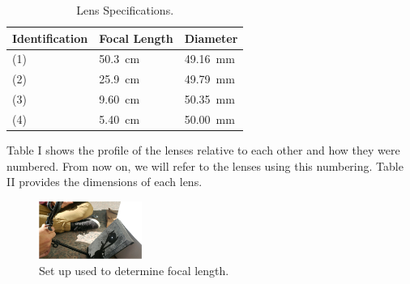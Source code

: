 \vspace*{-\baselineskip} %
\vspace*{-\baselineskip} %

\begin{table}[!h]
  \begin{center}
    \caption{Lens Specifications.} \label{lens_specs}
    \begin{tabular}{l | l | l}
      \hline \hline
      \multicolumn{1}{l}{\bf Identification} &
      \multicolumn{1}{l}{\bf Focal Length} &
      \multicolumn{1}{l}{\bf Diameter} \\
      \hline
      (1) & \SI{50.3}{\centi\meter} & \SI{49.16}{\milli\meter} \\
      (2) & \SI{25.9}{\centi\meter} & \SI{49.79}{\milli\meter} \\
      (3) & \SI{9.60}{\centi\meter} & \SI{50.35}{\milli\meter} \\
      (4) & \SI{5.40}{\centi\meter} & \SI{50.00}{\milli\meter} \\
    \end{tabular}
  \end{center}
\end{table}

Table I shows the profile of the lenses relative to each other and how they were numbered. From now on, we will refer to the lenses using this numbering. Table II provides the dimensions of each lens. 

\begin{figure}[!h]
  \begin{center}
    \includegraphics[width=0.3\textwidth]{./Figures/focal_length.pdf}
    \caption{Set up used to determine focal length.}
  \end{center}
\end{figure}


